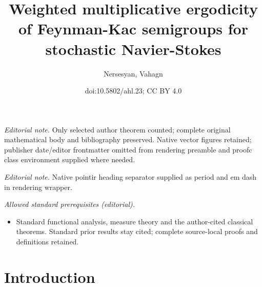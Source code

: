 \documentclass[10pt]{amsart}
\title{Weighted multiplicative ergodicity of Feynman-Kac semigroups for stochastic Navier-Stokes}
\author{Nersesyan, Vahagn}
\date{doi:10.5802/ahl.23; CC BY 4.0}
\theoremstyle{definition}\newtheorem{defi}[theo]{Definition}\newtheorem{rema}[theo]{Remark}\newtheorem{exam}[theo]{Example}\newtheorem{exem}[theo]{Example}\newtheorem{nota}[theo]{Notation}
\begin{document}
\maketitle
\noindent\textit{Editorial note.} Only selected author theorem counted; complete original mathematical body and bibliography preserved. Native vector figures retained; publisher date/editor frontmatter omitted from rendering preamble and proofc class environment supplied where needed.\par\medskip
\noindent\textit{Editorial note.} Native pointir heading separator supplied as period and em dash in rendering wrapper.\par\medskip
\noindent\textit{Allowed standard prerequisites (editorial).}\begin{itemize}
\item Standard functional analysis, measure theory and the author-cited classical theorems. Standard prior results stay cited; complete source-local proofs and definitions retained.
\end{itemize}\medskip

\section{Introduction}\label{S:0}
\end{document}
